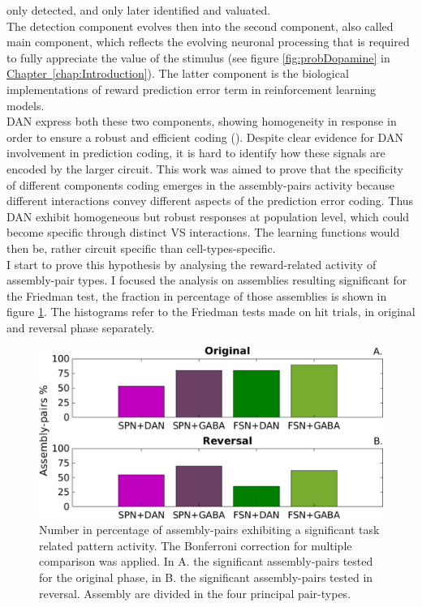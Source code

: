 only detected, and only later identified and valuated.\\The detection component evolves then into the second component, also called main component, which reflects the evolving neuronal processing that is required to fully appreciate the value of the stimulus (see figure \ref{fig:probDopamine} in \hyperref[chap:Introduction]{Chapter~\ref*{chap:Introduction}}). The latter component is the biological implementations of reward prediction error term in reinforcement learning models.\\DAN express both these two components, showing homogeneity in response in order to ensure a robust and efficient coding (\cite{UchidaDop}). Despite clear evidence for DAN involvement in prediction coding, it is hard to identify how these signals are encoded by the larger circuit. This work was aimed to prove that the specificity of different components coding emerges in the assembly-pairs activity because different interactions convey different aspects of the prediction error coding. Thus DAN exhibit homogeneous but robust responses at population level, which could become specific through distinct VS interactions. The learning functions would then be, rather circuit specific than cell-types-specific.\\I start to prove this hypothesis by analysing the reward-related activity of assembly-pair types. I focused the analysis on assemblies resulting significant for the Friedman test, the fraction in percentage of those assemblies is shown in figure \ref{fig:PercAsFried}. The histograms refer to the Friedman tests made on hit trials, in original and reversal phase separately.\\
\begin{figure}
    \centering
    \includegraphics[scale=0.5]{figures/PercFriedHitTrialsBFf.pdf}
    \caption{Number in percentage of assembly-pairs exhibiting a significant task related pattern activity. The Bonferroni correction for multiple comparison was applied. In A. the significant assembly-pairs tested for the original phase, in B. the significant assembly-pairs tested in reversal. Assembly are divided in the four principal pair-types.}
    \label{fig:PercAsFried}
\end{figure}
